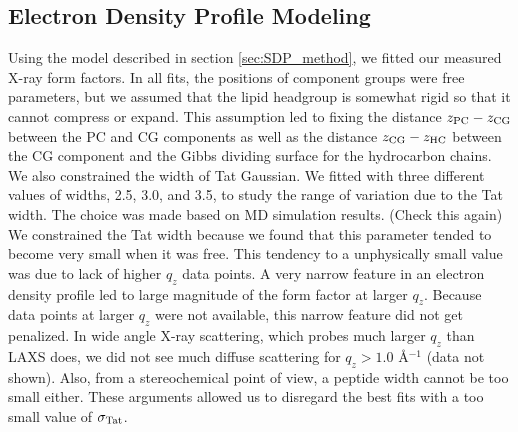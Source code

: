 \subsection{Electron Density Profile Modeling}\label{sec:SDP_results}
Using the model described in section \ref{sec:SDP_method}, 
we fitted our measured X-ray form factors. In all fits,
the positions of component groups were free parameters, but we 
assumed that the lipid headgroup is somewhat rigid so that it cannot compress
or expand. This assumption led to fixing the distance
$z_\textrm{PC}-z_\textrm{CG}$ between the PC and CG components as well
as the distance $z_\textrm{CG}-z_\textrm{HC}$ between the CG component and the Gibbs dividing
surface for the hydrocarbon chains. 
We also constrained the width of Tat 
Gaussian. We fitted with three different values of widths,
2.5, 3.0, and 3.5, to study the range of variation due to the Tat width. 
The choice was made based on MD simulation results. (Check this again)
We constrained the Tat width 
because we found that this parameter tended to become very small
when it was free. This tendency to a unphysically small value was due to 
lack of higher $q_z$ data points. A very narrow feature in an electron density profile
led to large magnitude of the form factor at larger $q_z$. Because data 
points at larger $q_z$ were not available, this narrow feature did not get penalized. 
In wide angle X-ray scattering, which probes much larger $q_z$ than LAXS does,
we did not see much diffuse scattering for $q_z > 1.0$ \AA$^{-1}$ (data not shown).
Also, from a stereochemical point of view, a peptide width cannot be too small either.
These arguments allowed us to disregard the best fits with a too small value
of $\sigma_\textrm{Tat}$.

